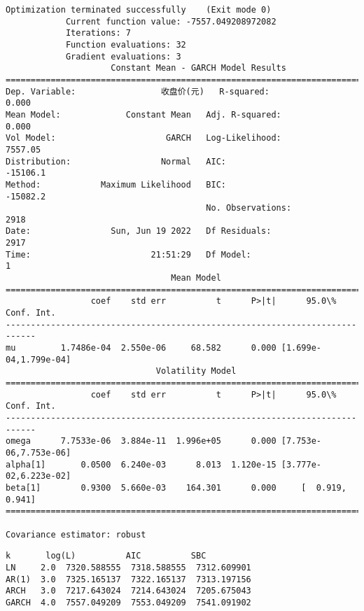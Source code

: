 \documentclass[11pt]{article}
\makeatletter
\newcommand{\boxspacing}{\kern\kvtcb@left@rule\kern\kvtcb@boxsep}
\newcommand{\prompt}[4]{
        {\ttfamily\llap{{\color{#2}[#3]:\hspace{3pt}#4}}\vspace{-\baselineskip}}
    }
\makeatother
\begin{document}
    \begin{Verbatim}[commandchars=\\\{\}]
Optimization terminated successfully    (Exit mode 0)
            Current function value: -7557.049208972082
            Iterations: 7
            Function evaluations: 32
            Gradient evaluations: 3
                     Constant Mean - GARCH Model Results
==============================================================================
Dep. Variable:                 收盘价(元)   R-squared:                       0.000
Mean Model:             Constant Mean   Adj. R-squared:                  0.000
Vol Model:                      GARCH   Log-Likelihood:                7557.05
Distribution:                  Normal   AIC:                          -15106.1
Method:            Maximum Likelihood   BIC:                          -15082.2
                                        No. Observations:                 2918
Date:                Sun, Jun 19 2022   Df Residuals:                     2917
Time:                        21:51:29   Df Model:                            1
                                 Mean Model
============================================================================
                 coef    std err          t      P>|t|      95.0\% Conf. Int.
----------------------------------------------------------------------------
mu         1.7486e-04  2.550e-06     68.582      0.000 [1.699e-04,1.799e-04]
                              Volatility Model
============================================================================
                 coef    std err          t      P>|t|      95.0\% Conf. Int.
----------------------------------------------------------------------------
omega      7.7533e-06  3.884e-11  1.996e+05      0.000 [7.753e-06,7.753e-06]
alpha[1]       0.0500  6.240e-03      8.013  1.120e-15 [3.777e-02,6.223e-02]
beta[1]        0.9300  5.660e-03    164.301      0.000     [  0.919,  0.941]
============================================================================

Covariance estimator: robust
    \end{Verbatim}

            \begin{tcolorbox}[breakable, size=fbox, boxrule=.5pt, pad at break*=1mm, opacityfill=0]
\prompt{Out}{outcolor}{5}{\boxspacing}
\begin{Verbatim}[commandchars=\\\{\}]
         k       log(L)          AIC          SBC
LN     2.0  7320.588555  7318.588555  7312.609901
AR(1)  3.0  7325.165137  7322.165137  7313.197156
ARCH   3.0  7217.643024  7214.643024  7205.675043
GARCH  4.0  7557.049209  7553.049209  7541.091902
\end{Verbatim}
\end{tcolorbox}
\end{document}
